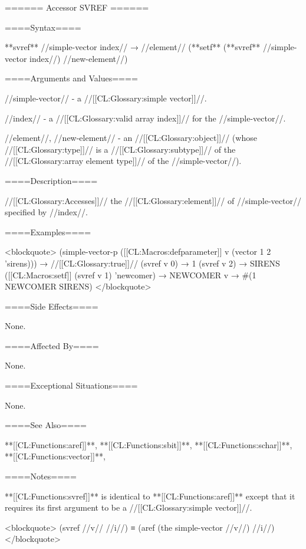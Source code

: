 ====== Accessor SVREF ======

====Syntax====

**svref** //simple-vector index// → //element// (**setf** (**svref** //simple-vector index//) //new-element//)

====Arguments and Values====

//simple-vector// - a //[[CL:Glossary:simple vector]]//.

//index// - a //[[CL:Glossary:valid array index]]// for the //simple-vector//.

//element//, //new-element// - an //[[CL:Glossary:object]]// (whose //[[CL:Glossary:type]]// is a //[[CL:Glossary:subtype]]// of the //[[CL:Glossary:array element type]]// of the //simple-vector//).

====Description====

//[[CL:Glossary:Accesses]]// the //[[CL:Glossary:element]]// of //simple-vector// specified by //index//.

====Examples====

<blockquote> (simple-vector-p ([[CL:Macros:defparameter]] v (vector 1 2 'sirens))) → //[[CL:Glossary:true]]// (svref v 0) → 1 (svref v 2) → SIRENS ([[CL:Macros:setf]] (svref v 1) 'newcomer) → NEWCOMER v → #(1 NEWCOMER SIRENS) </blockquote>

====Side Effects====

None.

====Affected By====

None.

====Exceptional Situations====

None.

====See Also====

**[[CL:Functions:aref]]**, **[[CL:Functions:sbit]]**, **[[CL:Functions:schar]]**, **[[CL:Functions:vector]]**,

{\secref\ConstantModification}

====Notes====

**[[CL:Functions:svref]]** is identical to **[[CL:Functions:aref]]** except that it requires its first argument to be a //[[CL:Glossary:simple vector]]//.

<blockquote> (svref //v// //i//) ≡ (aref (the simple-vector //v//) //i//) </blockquote>


